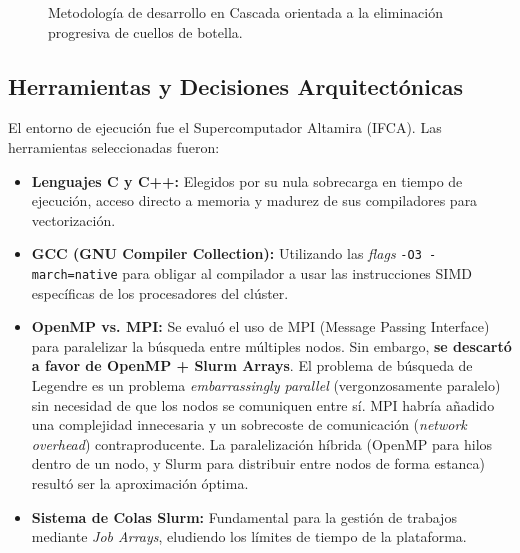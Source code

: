 \documentclass[12pt,a4paper]{tfg_domingo}
\begin{document}
\begin{figure}[htb!]
    \centering
    \caption{Metodología de desarrollo en Cascada orientada a la eliminación progresiva de cuellos de botella.}
    \label{fig:waterfall}
\end{figure}
\subsection{Herramientas y Decisiones Arquitectónicas}
El entorno de ejecución fue el Supercomputador Altamira (IFCA). Las herramientas seleccionadas fueron:
\begin{itemize}
    \item \textbf{Lenguajes C y C++:} Elegidos por su nula sobrecarga en tiempo de ejecución, acceso directo a memoria y madurez de sus compiladores para vectorización.
    \item \textbf{GCC (GNU Compiler Collection):} Utilizando las \emph{flags} \texttt{-O3 -march=native} para obligar al compilador a usar las instrucciones SIMD específicas de los procesadores del clúster.
    \item \textbf{OpenMP vs. MPI:} Se evaluó el uso de MPI (Message Passing Interface) para paralelizar la búsqueda entre múltiples nodos. Sin embargo, \textbf{se descartó a favor de OpenMP + Slurm Arrays}. El problema de búsqueda de Legendre es un problema \emph{embarrassingly parallel} (vergonzosamente paralelo) sin necesidad de que los nodos se comuniquen entre sí. MPI habría añadido una complejidad innecesaria y un sobrecoste de comunicación (\emph{network overhead}) contraproducente. La paralelización híbrida (OpenMP para hilos dentro de un nodo, y Slurm para distribuir entre nodos de forma estanca) resultó ser la aproximación óptima.
    \item \textbf{Sistema de Colas Slurm:} Fundamental para la gestión de trabajos mediante \emph{Job Arrays}, eludiendo los límites de tiempo de la plataforma.
\end{itemize}
\end{document}
